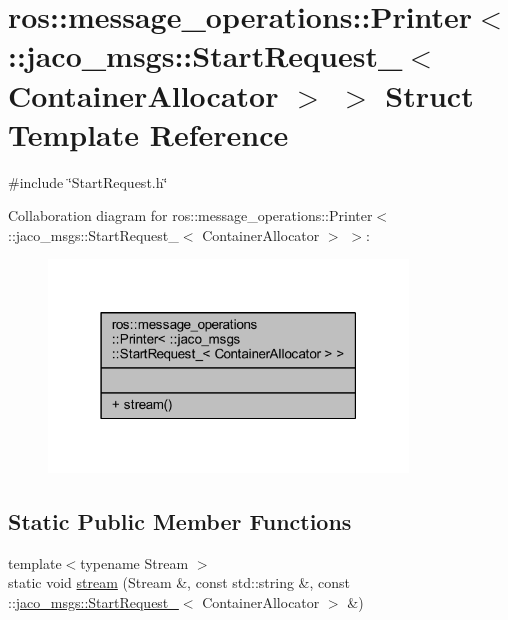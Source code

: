 \hypertarget{structros_1_1message__operations_1_1Printer_3_01_1_1jaco__msgs_1_1StartRequest___3_01ContainerAllocator_01_4_01_4}{}\section{ros\+:\+:message\+\_\+operations\+:\+:Printer$<$ \+:\+:jaco\+\_\+msgs\+:\+:Start\+Request\+\_\+$<$ Container\+Allocator $>$ $>$ Struct Template Reference}
\label{structros_1_1message__operations_1_1Printer_3_01_1_1jaco__msgs_1_1StartRequest___3_01ContainerAllocator_01_4_01_4}


{\ttfamily \#include \char`\"{}Start\+Request.\+h\char`\"{}}



Collaboration diagram for ros\+:\+:message\+\_\+operations\+:\+:Printer$<$ \+:\+:jaco\+\_\+msgs\+:\+:Start\+Request\+\_\+$<$ Container\+Allocator $>$ $>$\+:
\nopagebreak
\begin{figure}[H]
\begin{center}
\leavevmode
\includegraphics[width=271pt]{d0/d6f/structros_1_1message__operations_1_1Printer_3_01_1_1jaco__msgs_1_1StartRequest___3_01ContainerAllocator_01_4_01_4__coll__graph}
\end{center}
\end{figure}
\subsection*{Static Public Member Functions}
\begin{DoxyCompactItemize}
\item 
{\footnotesize template$<$typename Stream $>$ }\\static void \hyperlink{structros_1_1message__operations_1_1Printer_3_01_1_1jaco__msgs_1_1StartRequest___3_01ContainerAllocator_01_4_01_4_ade236317de56bd2036054704959f1d7f}{stream} (Stream \&, const std\+::string \&, const \+::\hyperlink{structjaco__msgs_1_1StartRequest__}{jaco\+\_\+msgs\+::\+Start\+Request\+\_\+}$<$ Container\+Allocator $>$ \&)
\end{DoxyCompactItemize}


